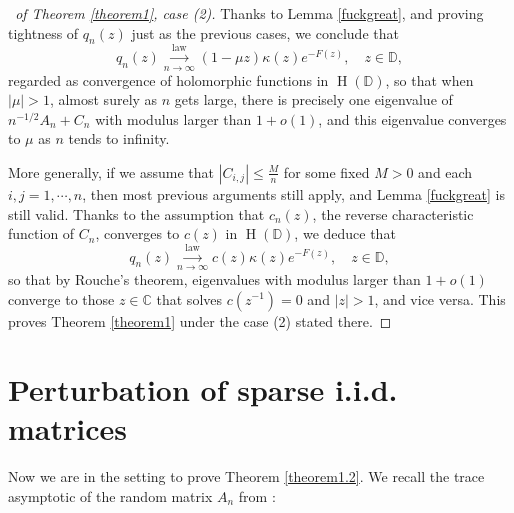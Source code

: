 \documentclass[12pt, reqno]{amsart}
\theoremstyle{definition}
\theoremstyle{remark}
\numberwithin{equation}{section}
\begin{document}
\begin{proof}[\proofname\ of Theorem \ref{theorem1}, case (2)]
Thanks to Lemma \ref{fuckgreat}, and proving tightness of $q_n(z)$ just as the previous cases, we conclude that 
\begin{equation}
   q_n(z)\overset{\text{law}}{\underset{n\to\infty}\longrightarrow}(1-\mu z)\kappa(z)e^{-F(z)},\quad z\in\mathbb{D},
\end{equation}
regarded as convergence of holomorphic functions in $\operatorname{H}(\mathbb{D})$, so that when $|\mu|>1$, almost surely as $n$ gets large, there is precisely one eigenvalue of $n^{-1/2}A_n+C_n$ with modulus larger than $1+o(1)$, and this eigenvalue converges to $\mu$ as $n$ tends to infinity. 

More generally, if we assume that $|C_{i,j}|\leq \frac{M}{n}$ for some fixed $M>0$ and each $i,j=1,\cdots,n$, then most previous arguments still apply, and Lemma \ref{fuckgreat} is still valid. Thanks to the assumption that $c_n(z)$, the reverse characteristic function of $C_n$, converges to $c(z)$ in $\operatorname{H}(\mathbb{D})$, we deduce that
\begin{equation}
   q_n(z)\overset{\text{law}}{\underset{n\to\infty}\longrightarrow}c(z)\kappa(z)e^{-F(z)},\quad z\in\mathbb{D},
\end{equation}
so that by Rouche's theorem, eigenvalues with modulus larger than $1+o(1)$ converge to those $z\in\mathbb{C}$ that solves $c(z^{-1})=0$ and $|z|>1$, and vice versa.
This proves Theorem \ref{theorem1} under the case (2) stated there.
\end{proof}

\section{Perturbation of sparse i.i.d. matrices}
Now we are in the setting to prove Theorem \ref{theorem1.2}. We recall the trace asymptotic of the random matrix $A_n$ from \cite{coste2023sparse}: 
\end{document}
